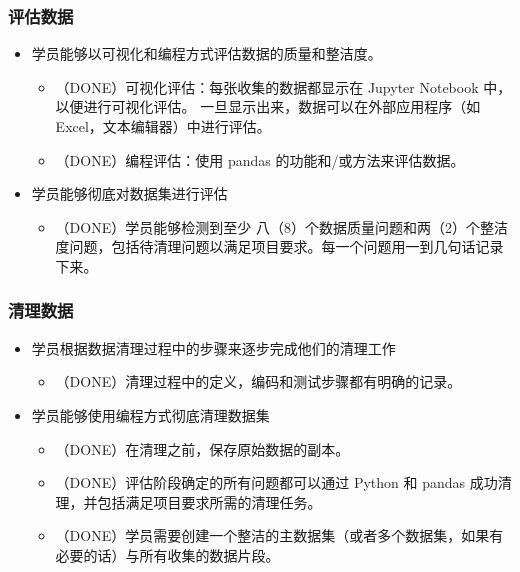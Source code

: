 \documentclass[11pt]{article}
\providecommand{\tightlist}{%
      \setlength{\itemsep}{0pt}\setlength{\parskip}{0pt}}
\begin{document}
\hypertarget{ux8bc4ux4f30ux6570ux636e}{%
\subsubsection{评估数据}\label{ux8bc4ux4f30ux6570ux636e}}

\begin{itemize}
\tightlist
\item
  学员能够以可视化和编程方式评估数据的质量和整洁度。

  \begin{itemize}
  \tightlist
  \item
    （DONE）可视化评估：每张收集的数据都显示在 Jupyter Notebook
    中，以便进行可视化评估。 一旦显示出来，数据可以在外部应用程序（如
    Excel，文本编辑器）中进行评估。
  \item
    （DONE）编程评估：使用 pandas 的功能和/或方法来评估数据。
  \end{itemize}
\item
  学员能够彻底对数据集进行评估

  \begin{itemize}
  \tightlist
  \item
    （DONE）学员能够检测到至少
    八（8）个数据质量问题和两（2）个整洁度问题，包括待清理问题以满足项目要求。每一个问题用一到几句话记录下来。
  \end{itemize}
\end{itemize}

\hypertarget{ux6e05ux7406ux6570ux636e}{%
\subsubsection{清理数据}\label{ux6e05ux7406ux6570ux636e}}

\begin{itemize}
\tightlist
\item
  学员根据数据清理过程中的步骤来逐步完成他们的清理工作

  \begin{itemize}
  \tightlist
  \item
    （DONE）清理过程中的定义，编码和测试步骤都有明确的记录。
  \end{itemize}
\item
  学员能够使用编程方式彻底清理数据集

  \begin{itemize}
  \tightlist
  \item
    （DONE）在清理之前，保存原始数据的副本。
  \item
    （DONE）评估阶段确定的所有问题都可以通过 Python 和 pandas
    成功清理，并包括满足项目要求所需的清理任务。
  \item
    （DONE）学员需要创建一个整洁的主数据集（或者多个数据集，如果有必要的话）与所有收集的数据片段。
  \end{itemize}
\end{itemize}
\end{document}
